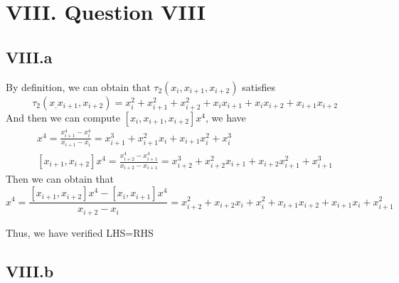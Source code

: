 \documentclass[a4paper]{article}
\begin{document}
\section*{VIII. Question VIII}

\subsection*{VIII.a}

By definition, we can obtain that $\tau_2(x_i,x_{i+1},x_{i+2})$ satisfies
\begin{equation}
  \tau_2(x_,x_{i+1},x_{i+2})=x_i^2+x_{i+1}^2+x_{i+2}^2+x_ix_{i+1}+x_ix_{i+2}+x_{i+1}x_{i+2}
\end{equation}
And then we can compute $[x_i,x_{i+1},x_{i+2}]x^4$, we have 
\begin{align}
  [x_i,x_{i+1}]x^4=\frac{x_{i+1}^4-x_i^4}{x_{i+1}-x_i}=x_{i+1}^3+x_{i+1}^2x_i+x_{i+1}x_i^2+x_i^3\\
  [x_{i+1},x_{i+2}]x^4=\frac{x_{i+2}^4-x_{i+1}^4}{x_{i+2}-x_{i+1}}=x_{i+2}^3+x_{i+2}^2x_{i+1}+x_{i+2}x_{i+1}^2+x_{i+1}^3
\end{align}
Then we can obtain that
\begin{equation}
  [x_i,x_{i+1},x_{i+2}]x^4=\frac{[x_{i+1},x_{i+2}]x^4-[x_i,x_{i+1}]x^4}{x_{i+2}-x_i}= x_{i+2}^2 + x_{i+2} x_i + x_i^2 + x_{i+1} x_{i+2} + x_{i+1} x_i + x_{i+1}^2
\end{equation}

Thus, we have verified LHS=RHS

\subsection*{VIII.b}
\end{document}
